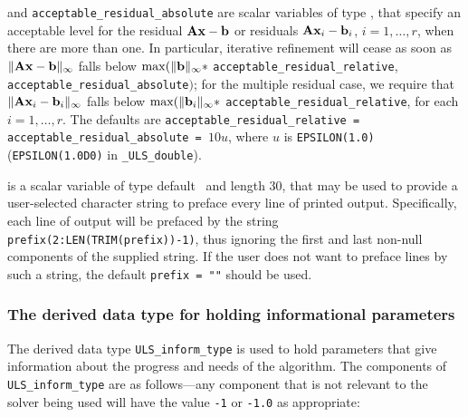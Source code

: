 \documentclass{galahad}
\newcommand{\packagename}{ULS}
\newcommand{\fullpackagename}{\libraryname\_\-\packagename}
\begin{document}
\begin{description}
  and {\tt acceptable\_residual\_absolute} 
are scalar variables of type \realdp, that 
specify an acceptable level for the residual ${\mathbf{A}} {\mathbf{x}} - {\mathbf{b}}$ or residuals 
${\mathbf{A}} {\mathbf{x}}_i - {\mathbf{b}}_i$, $i=1,\ldots,r$,  when there are more than one.
In particular, iterative refinement will cease as soon as
$\|{\mathbf{A}} {\mathbf{x}} - {\mathbf{b}}\|_{\infty}$ falls below
$\max (\| {\mathbf{b}}\|_{\infty} \ast$ {\tt acceptable\_residual\_relative}, 
{\tt acceptable\_residual\_absolute}$)$;
for the multiple residual case, we require that
$\|{\mathbf{A}} {\mathbf{x}}_i - {\mathbf{b}}_i\|_{\infty}$ falls below
$\max (\| {\mathbf{b}}_i\|_{\infty} \ast$ {\tt acceptable\_residual\_relative}, 
for each $i=1,\ldots,r$.
The defaults are {\tt acceptable\_residual\_relative =
acceptable\_resi\-dual\_absolute = }$10 u$,
where $u$ is {\tt EPSILON(1.0)} ({\tt EPSILON(1.0D0)} in 
{\tt \fullpackagename\_double}).

 is a scalar variable of type default \character\
and length 30, that may be used to provide a user-selected 
character string to preface every line of printed output. 
Specifically, each line of output will be prefaced by the string 
{\tt prefix(2:LEN(TRIM(prefix))-1)},
thus ignoring the first and last non-null components of the
supplied string. If the user does not want to preface lines by such
a string, the default {\tt prefix = ""} should be used.

\end{description}


\subsubsection{The derived data type for holding informational
 parameters}\label{typeinform}
The derived data type 
{\tt \packagename\_inform\_type} 
is used to hold parameters that give information about the progress and needs 
of the algorithm. The components of 
{\tt \packagename\_inform\_type} 
are as follows---any component that is not relevant to the solver being used
will have the value {\tt -1} or {\tt -1.0} as appropriate:
\end{document}
